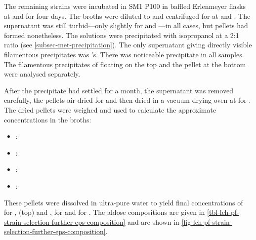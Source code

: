 The remaining strains were incubated in  SM1 P100 in  baffled Erlenmeyer flasks at  and  for four days. The broths were diluted to  and centrifuged for  at  and . The supernatant was still turbid---only slightly for  and ---in all cases, but pellets had formed nonetheless. The solutions were precipitated with isopropanol at a 2:1 ratio (see \vref{subsec-met-precipitation}). The only supernatant giving directly visible filamentous precipitates was 's. There was noticeable precipitate in all samples. The filamentous precipitates of  floating on the top and the pellet at the bottom were analysed separately.

After the precipitate had settled for a month, the supernatant was removed carefully, the pellets air-dried for  and then dried in a vacuum drying oven at  for . The dried pellets were weighed and used to calculate the approximate \eps{} concentrations in the broths:

\begin{itemize}
	\item {}: 
	\item {}: 
	\item {}: 
	\item {}: 
\end{itemize}

These pellets were dissolved in ultra-pure water to yield final concentrations of  for ,  (top) and ,  for  and  for . The \eps{} aldose compositions are given in \vref{tbl-lch-pf-strain-selection-further-eps-composition} and are shown in \vref{fig-lch-pf-strain-selection-further-eps-composition}.

